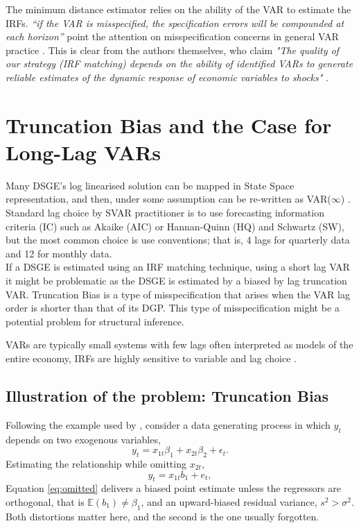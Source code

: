 \documentclass[12pt, a4paper]{article}
\begin{document}
The minimum distance estimator relies on the ability of the VAR to estimate the IRFs.
\textit{``if the VAR is misspecified, the specification errors will be compounded at each horizon''}
point the attention on misspecification concerns in general VAR practice \citep[p.~83]{Ramey2016}.
This is clear from the authors themselves, who claim \textit{"The quality of our strategy (IRF matching)
depends on the ability of identified VARs to generate reliable estimates of the
dynamic response of economic variables to shocks"} \citep[p.~3, fn.~10]{ACEL2011}.

\section{Truncation Bias and the Case for Long-Lag VARs}
\label{sec:truncation}

Many DSGE's log linearised solution can be mapped in State Space representation, and then, under some assumption
can be re-written as VAR($\infty$) \citep{FVRRSS2007}. Standard lag choice by SVAR practitioner is to 
use forecasting information criteria (IC) such as Akaike (AIC) or Hannan-Quinn (HQ) and Schwartz (SW), but the most common choice is 
use conventions; that is, 4 lags for quarterly data and 12 for monthly data.
\\

If a DSGE is estimated using an IRF matching technique, using a short lag VAR it might be problematic
as the DSGE is estimated by a biased by lag truncation VAR.
Truncation Bias is a type of misspecification that arises when the VAR lag order is shorter than that of its DGP.
This type of misspecification might be a potential problem for structural inference.

VARs are typically small systems with few lags often interpreted as models of the entire economy, 
IRFs are highly sensitive to variable and lag choice \citep{Humble_VARs_2026,Long_Lag2025}.


\subsection{Illustration of the problem: Truncation Bias}

Following the example used by \citet{Long_Lag2025}, consider a data generating process in which $y_t$ depends on
two exogenous variables,
\begin{equation}
    y_t = x_{1t}\beta_1 + x_{2t}\beta_2 + \epsilon_t .
    \label{eq:dgp}
\end{equation}
Estimating the relationship while omitting $x_{2t}$,
\begin{equation}
    y_t = x_{1t} b_1 + e_t ,
    \label{eq:omitted}
\end{equation}
Equation \ref{eq:omitted} delivers a biased point estimate unless the regressors are orthogonal, that is 
$\mathbb{E}(b_1)\neq\beta_1$, and an upward-biased residual variance, $s^2 > \sigma^2$. Both
distortions matter here, and the second is the one usually forgotten.
\end{document}
